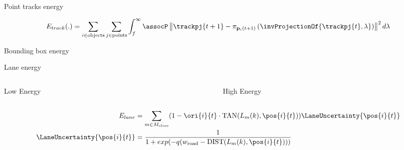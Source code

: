 \begin{frame}{Point tracks energy}
  \centering
  \small{
  
  \begin{align*}
    \Energy{track}(.) = 
    \sum_{i \in \text{objects}}
    \sum_{j \in \text{points}}
    \int_{f}^{\infty}
      \assocP
      \left\|\trackpj{t+1} - \projectionOft{\invProjectionOf{\trackpj{t}, \lambda}}\right\|^2
      d\lambda
  \end{align*}
}
\end{frame}

\begin{frame}{Bounding box energy}
  \centering
  \begin{figure}
  
  \end{figure}
\end{frame}

\newcommand{\carbev}{
  \coordinate (ra) at (1,0.2);
  \coordinate (rb) at (2,0.7);
  \draw [thick,blue] (ra) rectangle (rb);
  \draw [thick,black] let \p1 = (ra), \p2 = (rb) in ($.5*(\x1, \y2) + .5*(\x1, \y1) + (-0.2,0)$) -- ($.5*(ra)+.5*(rb)$);
}
\begin{frame}{Lane energy}
      \centering
  \begin{columns}
    \begin{column}[t]{0.5\textwidth}
      \centering
      Low Energy

    \end{column}
    \begin{column}[t]{0.5\textwidth}
      \centering
      High Energy

    \end{column}
  \end{columns}
  \begin{align}
    \label{eq:laneOrientationEnergy}
    \Energy{lane} &= 
    \sum_{m \in M_{\text{close}}}
    (1 - \ori{i}{t} \cdot \text{TAN}(L_{m}(k), \pos{i}{t}) )
    \LaneUncertainty{\pos{i}{t}}
    \\
    \LaneUncertainty{\pos{i}{t}} &=
    \frac{1}{1 + exp(-q(w_{\text{road}} - \text{DIST}(L_{m}(k), \pos{i}{t})))}
  \end{align}
    
\end{frame}

